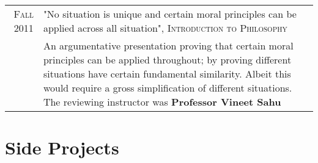 \documentclass[a4paper,10pt]{article} %
\begin{document}
\begin{tabular}{r|p{11cm}}
    \textsc{Fall 2011} & "No situation is unique and certain moral principles can be applied across all situation",
        \textsc{Introduction to Philosophy} \\
        & \footnotesize{ An argumentative presentation proving that certain moral principles can be applied throughout;
                by proving different situations have certain fundamental similarity.
                Albeit this would require a gross simplification of different situations.
                The reviewing instructor was \textbf{Professor Vineet Sahu}} \\

\end{tabular}

\section{Side Projects}
\end{document}
